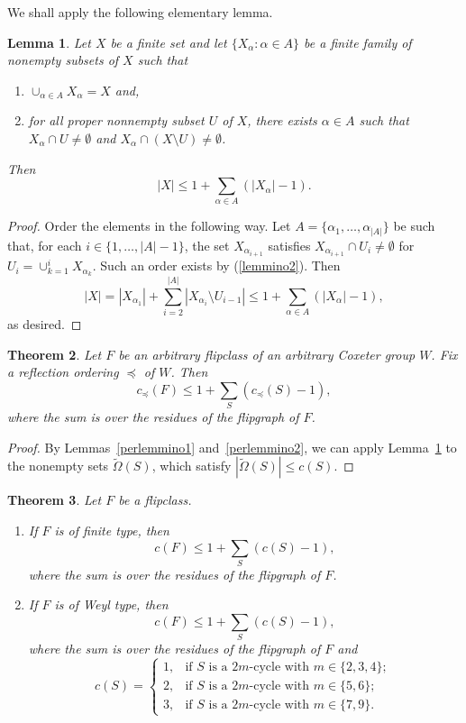 \documentclass[12pt,reqno]{amsart}
\theoremstyle{plain}
\newtheorem{thm}{Theorem}[section]
\newtheorem{lem}[thm]{Lemma}
\theoremstyle{definition}
\theoremstyle{remark}
\begin{document}
We shall apply the following elementary lemma.
\begin{lem}
\label{lemmino}
Let $X$ be a finite set and let $\{X_{\alpha} : \alpha\in A\}$ be a finite family of nonempty subsets of $X$ such that 
\begin{enumerate}
\item
\label{lemmino1}
 $\cup_{\alpha \in A} X_{\alpha} = X$ and, 
\item 
\label{lemmino2}
for all proper nonnempty subset $U$ of  $X$, there exists $\alpha \in A$ such that $X_{\alpha} \cap U \neq \emptyset$ and    $X_{\alpha} \cap (X\setminus U) \neq \emptyset$.
\end{enumerate}
Then $$|X|\leq 1+ \sum_{\alpha \in A} (|X_{\alpha}|-1).$$
\end{lem}
\begin{proof}
Order the elements in the following way. Let $A=\{\alpha_1, \ldots, \alpha_{|A|}\}$ be such that, for each $i\in \{1,\ldots,|A|-1\}$, the set  $X_{\alpha_{i+1}}$ satisfies $X_{\alpha_{i+1}} \cap U_i \neq \emptyset$ 
 for $U_i=\cup_{k=1}^{i} X_{\alpha_k}$. Such an order exists by (\ref{lemmino2}).
Then 
$$|X| =  |X_{\alpha_1}| + \sum_{i=2}^{|A|}  |X_{\alpha_i}\setminus U_{i-1}| \leq 1+ \sum_{\alpha \in A} ( |X_{\alpha}|-1 ) ,$$
as desired.
\end{proof}

\begin{thm}
\label{minore1}
Let $F$ be an arbitrary flipclass of an arbitrary Coxeter group $W$. Fix a reflection ordering $\preceq$ of $W$. Then
$$c_{\preceq}(F) \leq 1 + \sum_{S}(c_{\preceq}(S)-1),$$
where the sum is over the residues of the flipgraph of $F$.
\end{thm}

\begin{proof}
By Lemmas~\ref{perlemmino1} and~\ref{perlemmino2}, we can apply Lemma~\ref{lemmino} to the nonempty sets $\tilde{\Omega}(S)$, which satisfy $|\tilde{\Omega}(S)|\leq c(S)$.
\end{proof}


\begin{thm}
\label{minore2}
Let $F$ be a flipclass. 
\begin{enumerate}
\item
\label{minoreft}
 If $F$ is of finite type, then 
$$c(F) \leq 1 + \sum_{S}(c(S)-1),$$
where the sum is over the residues of the flipgraph of $F$.
\item
\label{minorew}  If $F$ is of Weyl type, then 
$$c(F) \leq 1 + \sum_{S}(c(S)-1),$$
where the sum is over the residues of the flipgraph of $F$ and
$$ c(S)= \left\{ \begin{array}{ll}
1, & \mbox{if $S$ is a $2m$-cycle with $m\in\{2,3,4\}$; } \\
2, & \mbox{if $S$ is a $2m$-cycle with $m\in\{5,6\}$; } \\
3, & \mbox{if $S$ is a $2m$-cycle with $m\in\{7,9\}$. } 
\end{array} \right. $$
\end{enumerate}
\end{thm}
\end{document}
